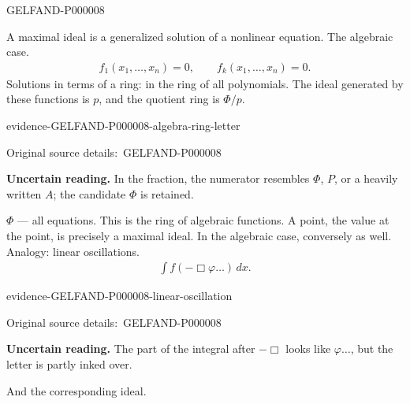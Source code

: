 \documentclass[11pt]{article}
\newcommand{\SourcePage}[2]{\par\smallskip\phantomsection\label{#1:source-page}{\small\sffamily\color{blue!55!black}#1}\par\smallskip}
\newcommand{\EvidenceBlock}[4]{%
 \par\smallskip\noindent\begin{minipage}{\linewidth}
 \begin{minipage}[t]{.47\linewidth}\vspace{0pt}\centering
 \csname evidence-#1-#2\endcsname\par
 {\scriptsize\SourceCropCaption\ #1}\par
 \end{minipage}\hfill
 \begin{minipage}[t]{.49\linewidth}\vspace{0pt}\raggedright
 {\small\color{orange!65!black}\textbf{#4} #3}\par
 \end{minipage}
 \end{minipage}\par\smallskip}
\newcommand{\Unclear}[3]{\EvidenceBlock{#1}{#2}{#3}{\ReadingCaption}}
\newcommand{\SourceCropCaption}{Original source details:}\newcommand{\ReadingCaption}{Uncertain reading.}\newcommand{\IncompleteCaption}{Undeciphered passage.}\newcommand{\DiagramCaption}{Diagram and typed description.}
\begin{document}
\SourcePage{GELFAND-P000008}{unlabelled}
A maximal ideal is a generalized solution of a nonlinear equation.
The algebraic case.
\begin{gather*}
 f_1(x_1,\ldots,x_n)=0,\qquad
 f_k(x_1,\ldots,x_n)=0.
\end{gather*}
Solutions in terms of a ring: in the ring of all polynomials.
The ideal generated by these functions is $p$, and the quotient ring is
$\Phi/p$.
\Unclear{GELFAND-P000008}{algebra-ring-letter}{In the fraction, the numerator resembles $\Phi$, $P$, or a heavily written $A$; the candidate $\Phi$ is retained.}
$\Phi$ — all equations.
This is the ring of algebraic functions.
A point, the value at the point, is precisely a maximal ideal.
In the algebraic case, conversely as well.
Analogy: linear oscillations.
\begin{gather*}
 \int f(-\Box\varphi\ldots)\,dx.
\end{gather*}
\Unclear{GELFAND-P000008}{linear-oscillation}{The part of the integral after $-\Box$ looks like $\varphi\ldots$, but the letter is partly inked over.}
And the corresponding ideal.
\end{document}
